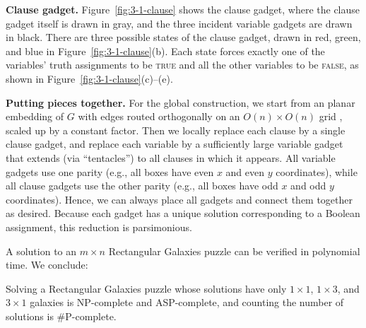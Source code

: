 \textbf{Clause gadget.}
Figure~\ref{fig:3-1-clause} shows the clause gadget,
where the clause gadget itself is drawn in gray,
and the three incident variable gadgets are drawn in black.
There are three possible states of the clause gadget,
drawn in red, green, and blue in Figure~\ref{fig:3-1-clause}(b).
Each state forces exactly one of the variables' truth assignments
to be \textsc{true} and all the other variables to be \textsc{false},
as shown in Figure~\ref{fig:3-1-clause}(c)--(e).

\textbf{Putting pieces together.}
For the global construction, we start from an planar embedding of $G$
with edges routed orthogonally on an $O(n) \times O(n)$ grid
\cite{biedl98}, scaled up by a constant factor.
Then we locally replace each clause by a single clause gadget,
and replace each variable by a sufficiently large variable gadget
that extends (via ``tentacles'') to all clauses in which it appears.
All variable gadgets use one parity
(e.g., all boxes have even $x$ and even $y$ coordinates),
while all clause gadgets 
use the other parity (e.g., all boxes have odd $x$ and odd $y$ coordinates).
Hence, we can always place all gadgets and connect them together as desired.
Because each gadget has a unique solution corresponding to a Boolean
assignment, this reduction is parsimonious.

A solution to an $m\times n$ Rectangular Galaxies puzzle can %
be verified in polynomial time. We conclude:

\begin{theorem}\label{th:sgr13}
	Solving a Rectangular Galaxies puzzle whose solutions have only $1\times 1$, $1\times 3$, and $3\times 1$ galaxies is NP-complete and ASP-complete, and counting the number of solutions is \#P-complete.
\end{theorem}
